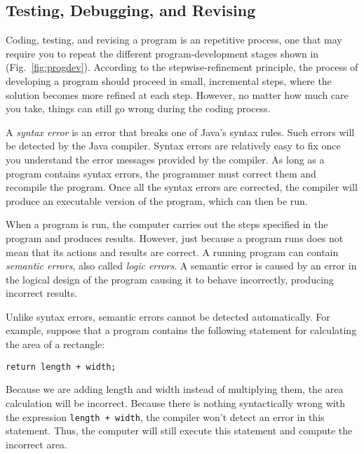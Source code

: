\subsection{Testing, Debugging, and Revising}

\noindent Coding, testing, and revising a program is an 
repetitive process, one that may require you to repeat the different
program-development stages shown in (Fig.~\ref{fig:progdev}).
According to the stepwise-refinement principle, the process of
developing a program should proceed in small, incremental steps, where
the solution becomes more refined at each step.  However, no matter
how much care you take, things can still go wrong during the coding
process.

A {\it syntax error} is an error that breaks one of Java's syntax
rules. Such errors will be detected by the Java compiler.  Syntax errors 
are relatively easy to fix once you understand the error messages
provided by the compiler.  As long as a program contains syntax
errors, the programmer must correct them and recompile the program.
Once all the syntax errors are corrected, the compiler will produce an
executable version of the program, which can then be run.

When a program is run, the computer carries out the steps specified in
the program and produces results.  However, just because a program
runs does not mean that its actions and results are correct.  A
running program can contain {\it semantic errors}, also called 
{\it logic errors}.  A semantic error is caused by an error in the
logical design of the program causing it to behave incorrectly,
producing incorrect results.

Unlike syntax errors, semantic errors cannot be detected
automatically.   For example, suppose that a program contains the
following statement for calculating the area of a rectangle:


\begin{jjjlisting}
\begin{lstlisting}
return length + width;
\end{lstlisting}
\end{jjjlisting}

\noindent Because we are adding length and width instead of
multiplying them, the area calculation will be incorrect.  Because
there is nothing syntactically wrong with the expression {\tt length +
width}, the compiler won't detect an error in this statement.  Thus,
the computer will still execute this statement and compute the
incorrect area. 

